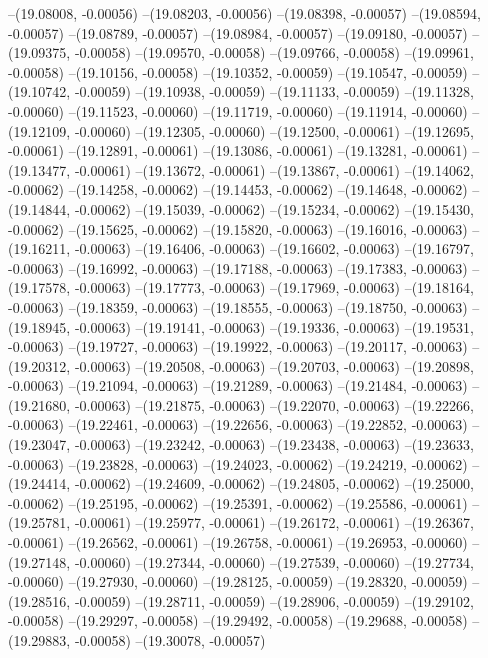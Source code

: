 --(19.08008, -0.00056)
--(19.08203, -0.00056)
--(19.08398, -0.00057)
--(19.08594, -0.00057)
--(19.08789, -0.00057)
--(19.08984, -0.00057)
--(19.09180, -0.00057)
--(19.09375, -0.00058)
--(19.09570, -0.00058)
--(19.09766, -0.00058)
--(19.09961, -0.00058)
--(19.10156, -0.00058)
--(19.10352, -0.00059)
--(19.10547, -0.00059)
--(19.10742, -0.00059)
--(19.10938, -0.00059)
--(19.11133, -0.00059)
--(19.11328, -0.00060)
--(19.11523, -0.00060)
--(19.11719, -0.00060)
--(19.11914, -0.00060)
--(19.12109, -0.00060)
--(19.12305, -0.00060)
--(19.12500, -0.00061)
--(19.12695, -0.00061)
--(19.12891, -0.00061)
--(19.13086, -0.00061)
--(19.13281, -0.00061)
--(19.13477, -0.00061)
--(19.13672, -0.00061)
--(19.13867, -0.00061)
--(19.14062, -0.00062)
--(19.14258, -0.00062)
--(19.14453, -0.00062)
--(19.14648, -0.00062)
--(19.14844, -0.00062)
--(19.15039, -0.00062)
--(19.15234, -0.00062)
--(19.15430, -0.00062)
--(19.15625, -0.00062)
--(19.15820, -0.00063)
--(19.16016, -0.00063)
--(19.16211, -0.00063)
--(19.16406, -0.00063)
--(19.16602, -0.00063)
--(19.16797, -0.00063)
--(19.16992, -0.00063)
--(19.17188, -0.00063)
--(19.17383, -0.00063)
--(19.17578, -0.00063)
--(19.17773, -0.00063)
--(19.17969, -0.00063)
--(19.18164, -0.00063)
--(19.18359, -0.00063)
--(19.18555, -0.00063)
--(19.18750, -0.00063)
--(19.18945, -0.00063)
--(19.19141, -0.00063)
--(19.19336, -0.00063)
--(19.19531, -0.00063)
--(19.19727, -0.00063)
--(19.19922, -0.00063)
--(19.20117, -0.00063)
--(19.20312, -0.00063)
--(19.20508, -0.00063)
--(19.20703, -0.00063)
--(19.20898, -0.00063)
--(19.21094, -0.00063)
--(19.21289, -0.00063)
--(19.21484, -0.00063)
--(19.21680, -0.00063)
--(19.21875, -0.00063)
--(19.22070, -0.00063)
--(19.22266, -0.00063)
--(19.22461, -0.00063)
--(19.22656, -0.00063)
--(19.22852, -0.00063)
--(19.23047, -0.00063)
--(19.23242, -0.00063)
--(19.23438, -0.00063)
--(19.23633, -0.00063)
--(19.23828, -0.00063)
--(19.24023, -0.00062)
--(19.24219, -0.00062)
--(19.24414, -0.00062)
--(19.24609, -0.00062)
--(19.24805, -0.00062)
--(19.25000, -0.00062)
--(19.25195, -0.00062)
--(19.25391, -0.00062)
--(19.25586, -0.00061)
--(19.25781, -0.00061)
--(19.25977, -0.00061)
--(19.26172, -0.00061)
--(19.26367, -0.00061)
--(19.26562, -0.00061)
--(19.26758, -0.00061)
--(19.26953, -0.00060)
--(19.27148, -0.00060)
--(19.27344, -0.00060)
--(19.27539, -0.00060)
--(19.27734, -0.00060)
--(19.27930, -0.00060)
--(19.28125, -0.00059)
--(19.28320, -0.00059)
--(19.28516, -0.00059)
--(19.28711, -0.00059)
--(19.28906, -0.00059)
--(19.29102, -0.00058)
--(19.29297, -0.00058)
--(19.29492, -0.00058)
--(19.29688, -0.00058)
--(19.29883, -0.00058)
--(19.30078, -0.00057)
